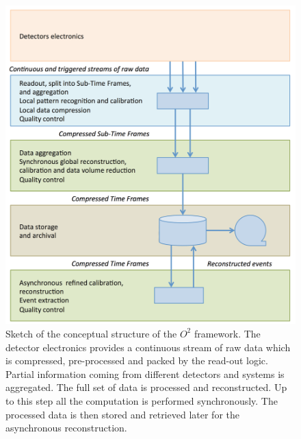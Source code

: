 \begin{figure}[!t]
\begin{center}
\includegraphics[width=0.95\linewidth]{Chapters/O2/Figs/O2.pdf}
\caption{Sketch of the conceptual structure of the $O^2$ framework. The detector electronics provides a continuous stream of raw data which is compressed, pre-processed and packed by the read-out logic. Partial information coming from different detectors and systems is aggregated. The full set of data is processed and reconstructed. Up to this step all the computation is performed synchronously. The processed data is then stored and retrieved later for the asynchronous reconstruction.}
\label{fig:O2_sketch}
\end{center}
\end{figure}

